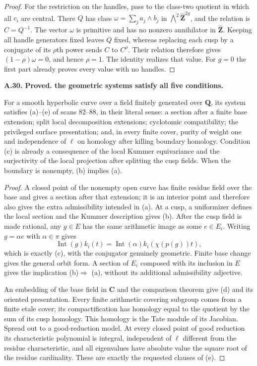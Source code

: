 \documentclass[11pt,oneside]{article}
\makeatletter
\newcounter{statementanchor}
\newenvironment{statement}[3]{%
 \refstepcounter{statementanchor}\def\@currentlabel{#1}%
 \par\addvspace{9pt}\noindent
 \textbf{#1. #2. #3.}\par\nobreak\noindent\ignorespaces
}{\par\addvspace{5pt}}
\makeatother
\begin{document}
\begin{proof}
For the restriction on the handles, pass to the
class-two quotient in which all $c_i$ are central.
There $Q$ has class
$\omega=\sum_j a_j\wedge b_j$ in
$\bigwedge^2\widehat{\mathbf Z}^{2g}$, and the
relation is $C=Q^{-1}$.  The vector $\omega$ is
primitive and has no nonzero annihilator in
$\widehat{\mathbf Z}$.  Keeping all handle generators
fixed leaves $Q$ fixed, whereas replacing each cusp
by a conjugate of its $\rho$th power sends $C$ to
$C^\rho$.  Their relation therefore gives
$(1-\rho)\omega=0$, and hence $\rho=1$.
The identity realizes that value.  For $g=0$ the first
part already proves every value with no handles.
\end{proof}

\begin{statement}{A.30}{Proved}{the geometric systems satisfy all five conditions}
\label{st:A.30}
\label{A:five-conditions}
For a smooth hyperbolic curve over a field finitely
generated over $\mathbf Q$, its system satisfies
(a)--(e) of scans 82--88, in their literal sense:
a section after a finite base extension; split local
decomposition extensions; cyclotomic compatibility;
the privileged surface presentation; and, in every
finite cover, purity of weight one and independence
of $\ell$ on homology after killing boundary homology.
Condition (c) is already a consequence of the local
Kummer equivariance and the surjectivity of the local
projection after splitting the cusp fields.  When the
boundary is nonempty, (b) implies (a).
\end{statement}
\begin{proof}
A closed point of the nonempty open curve has finite
residue field over the base and gives a section after
that extension; it is an interior point and therefore
also gives the extra admissibility intended in (a).
At a cusp, a uniformizer defines the local section
and the Kummer description gives (b).  After the cusp
field is made rational, any $g\in E$ has the same
arithmetic image as some $e\in E_i$.  Writing
$g=\alpha e$ with $\alpha\in\pi$ gives
\[
 \operatorname{Int}(g)k_i(t)=
       \operatorname{Int}(\alpha)k_i(\chi(p(g))t),
\]
which is exactly (c), with the conjugator genuinely
geometric.  Finite base change gives the general
orbit form.  A section of $E_i$ composed with its
inclusion in $E$ gives the implication (b)$\Rightarrow$
(a), without its additional admissibility adjective.

An embedding of the base field in $\mathbf C$ and
the comparison theorem give (d) and its oriented
presentation.  Every finite arithmetic covering
subgroup comes from a finite etale cover; its
compactification has homology equal to the quotient
by the sum of its cusp homology.  This homology is
the Tate module of its Jacobian.  Spread out to a
good-reduction model.  At every closed point of good
reduction its characteristic polynomial is integral,
independent of $\ell$ different from the residue
characteristic, and all eigenvalues have absolute
value the square root of the residue cardinality.
These are exactly the requested clauses of (e).
\end{proof}
\end{document}
